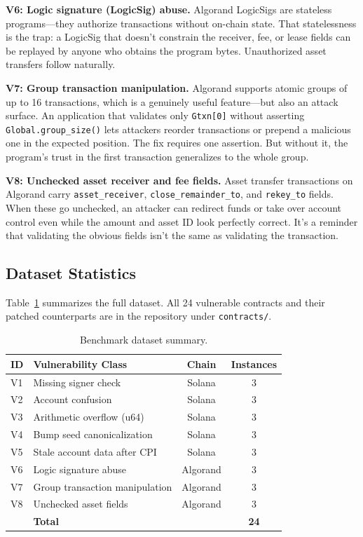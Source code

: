 \documentclass[journal]{IEEEtran}
\begin{document}
\textbf{V6: Logic signature (LogicSig) abuse.}
Algorand LogicSigs are stateless programs---they authorize transactions
without on-chain state.
That statelessness is the trap: a LogicSig that doesn't constrain the
receiver, fee, or lease fields can be replayed by anyone who obtains the
program bytes.
Unauthorized asset transfers follow naturally.

\textbf{V7: Group transaction manipulation.}
Algorand supports atomic groups of up to 16 transactions, which is a
genuinely useful feature---but also an attack surface.
An application that validates only \texttt{Gtxn[0]} without asserting
\texttt{Global.group\_size()} lets attackers reorder transactions or
prepend a malicious one in the expected position.
The fix requires one assertion. But without it, the program's trust
in the first transaction generalizes to the whole group.

\textbf{V8: Unchecked asset receiver and fee fields.}
Asset transfer transactions on Algorand carry \texttt{asset\_receiver},
\texttt{close\_remainder\_to}, and \texttt{rekey\_to} fields.
When these go unchecked, an attacker can redirect funds or take over
account control even while the amount and asset ID look perfectly correct.
It's a reminder that validating the obvious fields isn't the same as
validating the transaction.

\subsection{Dataset Statistics}

Table~\ref{tab:dataset} summarizes the full dataset.
All 24 vulnerable contracts and their patched counterparts are in the
repository under \texttt{contracts/}.

\begin{table}[!t]
\centering
\caption{Benchmark dataset summary.}
\label{tab:dataset}
\begin{tabular}{llcc}
\toprule
\textbf{ID} & \textbf{Vulnerability Class} & \textbf{Chain} & \textbf{Instances} \\
\midrule
V1 & Missing signer check          & Solana   & 3 \\
V2 & Account confusion             & Solana   & 3 \\
V3 & Arithmetic overflow (u64)     & Solana   & 3 \\
V4 & Bump seed canonicalization    & Solana   & 3 \\
V5 & Stale account data after CPI  & Solana   & 3 \\
V6 & Logic signature abuse         & Algorand & 3 \\
V7 & Group transaction manipulation& Algorand & 3 \\
V8 & Unchecked asset fields        & Algorand & 3 \\
\midrule
   & \textbf{Total}                &          & \textbf{24} \\
\bottomrule
\end{tabular}
\end{table}
\end{document}

